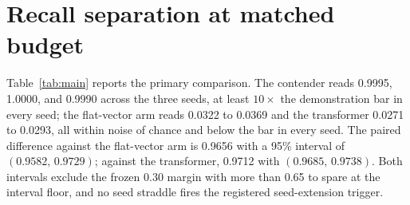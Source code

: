 \documentclass{article}
\begin{document}
\section{Recall separation at matched budget}
\label{sec:recall}

\begin{table}[t]
\centering
\small
\tableone
\caption{Episode-restricted recall accuracy on the primary cell ($K=32$,
$K/d=0.5$, binding span 224 tokens), per seed and mean, at the matched
final checkpoint (20{,}000 steps, identical data and optimizer; chance
$1/32 = 0.031$, demonstration bar $3/32 = 0.094$). The matrix fast-weight
model clears the bar in every seed; neither the parameter-matched
flat-vector recurrence nor the parameter-matched uncapped transformer ever
does. Both paired-seed 95\% $t$-intervals ($\mathrm{df}=2$) exclude the
pre-registered 0.30 margin. Accuracy is argmax-decoded and
episode-restricted, so it carries the capacity caveat of
Section~\ref{sec:setup}.}
\label{tab:main}
\end{table}

Table~\ref{tab:main} reports the primary comparison. The contender reads
0.9995, 1.0000, and 0.9990 across the three seeds, %
at least $10\times$ the demonstration bar in every seed; the flat-vector
arm reads 0.0322 to 0.0369 and the transformer 0.0271 to 0.0293, all
within noise of chance and below the bar in every
seed. %
The paired difference against the flat-vector arm is 0.9656 with a 95\%
interval of $(0.9582,\, 0.9729)$; against the transformer, 0.9712 with
$(0.9685,\, 0.9738)$. %
Both intervals exclude the frozen 0.30 margin with more than 0.65 to spare
at the interval floor, and no seed straddle fires the registered
seed-extension trigger. %
\end{document}
